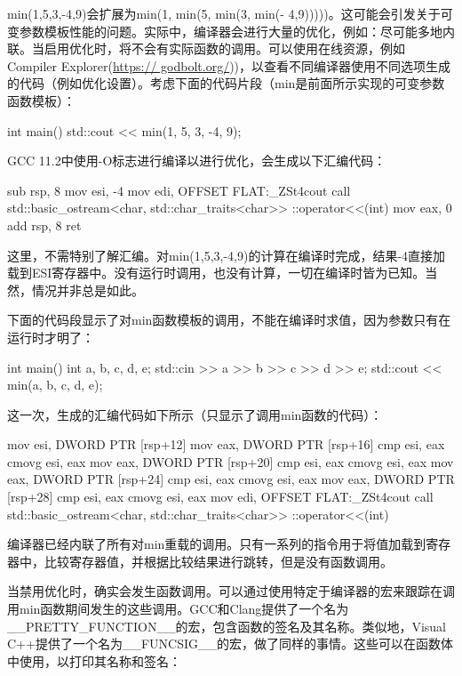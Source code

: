 min(1,5,3,-4,9)会扩展为min(1, min(5, min(3, min(- 4,9)))))。这可能会引发关于可变参数模板性能的问题。实际中，编译器会进行大量的优化，例如：尽可能多地内联。当启用优化时，将不会有实际函数的调用。可以使用在线资源，例如Compiler Explorer(\url{https:// godbolt.org/}))，以查看不同编译器使用不同选项生成的代码（例如优化设置）。考虑下面的代码片段（min是前面所示实现的可变参数函数模板）：

\begin{cpp}
int main()
{
	std::cout << min(1, 5, 3, -4, 9);
}
\end{cpp}

GCC 11.2中使用-O标志进行编译以进行优化，会生成以下汇编代码：

\begin{cpp}
sub rsp, 8
mov esi, -4
mov edi, OFFSET FLAT:_ZSt4cout
call std::basic_ostream<char, std::char_traits<char>>
        ::operator<<(int)
mov eax, 0
add rsp, 8
ret
\end{cpp}

这里，不需特别了解汇编。对min(1,5,3,-4,9)的计算在编译时完成，结果-4直接加载到ESI寄存器中。没有运行时调用，也没有计算，一切在编译时皆为已知。当然，情况并非总是如此。

下面的代码段显示了对min函数模板的调用，不能在编译时求值，因为参数只有在运行时才明了：

\begin{cpp}
int main()
{
	int a, b, c, d, e;
	std::cin >> a >> b >> c >> d >> e;
	std::cout << min(a, b, c, d, e);
}
\end{cpp}

这一次，生成的汇编代码如下所示（只显示了调用min函数的代码）：

\begin{cpp}
mov esi, DWORD PTR [rsp+12]
mov eax, DWORD PTR [rsp+16]
cmp esi, eax
cmovg esi, eax
mov eax, DWORD PTR [rsp+20]
cmp esi, eax
cmovg esi, eax
mov eax, DWORD PTR [rsp+24]
cmp esi, eax
cmovg esi, eax
mov eax, DWORD PTR [rsp+28]
cmp esi, eax
cmovg esi, eax
mov edi, OFFSET FLAT:_ZSt4cout
call std::basic_ostream<char, std::char_traits<char>>
        ::operator<<(int)
\end{cpp}

编译器已经内联了所有对min重载的调用。只有一系列的指令用于将值加载到寄存器中，比较寄存器值，并根据比较结果进行跳转，但是没有函数调用。

当禁用优化时，确实会发生函数调用。可以通过使用特定于编译器的宏来跟踪在调用min函数期间发生的这些调用。GCC和Clang提供了一个名为\_\_PRETTY\_FUNCTION\_\_的宏，包含函数的签名及其名称。类似地，Visual C++提供了一个名为\_\_FUNCSIG\_\_的宏，做了同样的事情。这些可以在函数体中使用，以打印其名称和签名：


